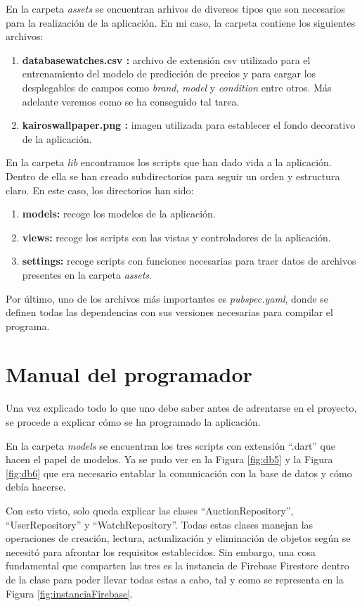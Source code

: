 	En la carpeta \emph{assets} se encuentran arhivos de diversos tipos que son necesarios para la realización de la aplicación. En mi caso, la carpeta contiene los siguientes archivos:
	\begin{enumerate}
		\item \textbf{databasewatches.csv :} archivo de extensión csv utilizado para el entrenamiento del modelo de predicción de precios y para cargar los desplegables de campos como \emph{brand}, \emph{model} y \emph{condition} entre otros. Más adelante veremos como se ha conseguido tal tarea.
		\item \textbf{kairoswallpaper.png :} imagen utilizada para establecer el fondo decorativo de la aplicación.
	\end{enumerate}
	
	En la carpeta \emph{lib} encontramos los scripts que han dado vida a la aplicación. Dentro de ella se han creado subdirectorios para seguir un orden y estructura claro. En este caso, los directorios han sido:
	\begin{enumerate}
		\item \textbf{models:} recoge los modelos de la aplicación.
		\item \textbf{views:} recoge los scripts con las vistas y controladores de la aplicación.
		\item \textbf{settings:} recoge scripts con funciones necesarias para traer datos de archivos presentes en la carpeta \emph{assets}.
	\end{enumerate}
	
	Por último, uno de los archivos más importantes es \emph{pubspec.yaml}, donde se definen todas las dependencias con sus versiones necesarias para compilar el programa.

\section{Manual del programador}

	Una vez explicado todo lo que uno debe saber antes de adrentarse en el proyecto, se procede a explicar cómo se ha programado la aplicación.
	
	En la carpeta \emph{models} se encuentran los tres scripts con extensión ``.dart'' que hacen el papel de modelos. Ya se pudo ver en la Figura \ref{fig:db5} y la Figura \ref{fig:db6} que era necesario entablar la comunicación con la base de datos y cómo debía hacerse.
	
	Con esto visto, solo queda explicar las clases ``AuctionRepository'', ``UserRepository'' y ``WatchRepository''. Todas estas clases manejan las operaciones de creación, lectura, actualización y eliminación de objetos según se necesitó para afrontar los requisitos establecidos. Sin embargo, una cosa fundamental que comparten las tres es la instancia de Firebase Firestore dentro de la clase para poder llevar todas estas a cabo, tal y como se representa en la Figura \ref{fig:instanciaFirebase}.

